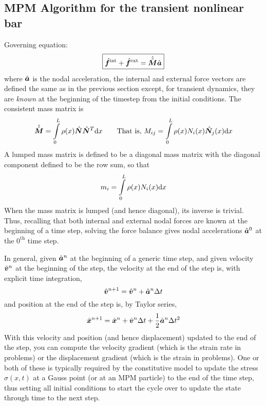 \subsection{MPM Algorithm for the \oneD transient nonlinear bar}
Governing equation:
\begin{equation}
 \boxed{\hat{\bm{f}}^\text{int} +  \hat{\bm{f}}^\text{ext} = \hat{\hat{\bm{M}}}\hat{\bm{a}}}
\label{eq:discrFequalMa}
\end{equation}
where $\hat{\bm{a}}$ is the nodal acceleration, the internal and external force vectors are defined the same as in the previous section except, for transient dynamics, they are \emph{known} at the beginning of the timestep from the initial conditions.  The consistent mass matrix is
\begin{equation}
  \hat{\hat{\bm{M}}}=\int\limits_0^L \rho(x)\hat{\bm{N}} \hat{\bm{N}}^T \mathrm{d} x
\qquad\text{That is, }
  M_{ij}=\int\limits_0^L \rho(x){N}_i(x) \hat{\bm{N}}_j(x) \mathrm{d} x
\end{equation}
A lumped mass matrix is defined to be a diagonal mass matrix with the \ith diagonal component defined to be the \ith row sum, so that
\begin{equation}
  m_i=\int\limits_0^L \rho(x){N}_i(x) \mathrm{d} x
\end{equation}
When the mass matrix is lumped (and hence diagonal), its inverse is trivial. Thus, recalling that both internal and external nodal forces are known at the beginning of a time step, solving the force balance gives nodal accelerations $\hat{\bm{a}}^0$ at the $0^\text{th}$ time step.  

In general, given $\hat{\bm{a}}^n$ at the beginning of a generic \nth time step, and given velocity $\hat{\bm{v}}^n$ at the beginning of the step, the velocity at the end of the step is, with explicit time integration,
\begin{equation}
  \hat{\bm{v}}^{n+1}=\hat{\bm{v}}^{n}+\hat{\bm{a}}^n \Delta {\ensuremath{t}}
\end{equation}
and position at the end of the step is, by Taylor series,
\begin{equation}
  \hat{\bm{x}}^{n+1}=\hat{\bm{x}}^{n}+\hat{\bm{v}}^n \Delta {\ensuremath{t}}+\frac{1}{2}\hat{\bm{a}}^n \Delta{\ensuremath{t}}^2
\end{equation}
With this velocity and position (and hence displacement) updated to the end of the step, you can compute the velocity gradient (which is the strain rate in \oneD problems) or the displacement gradient (which is the strain in \oneD problems). One or both of these is typically required by the constitutive model to update the stress $\sigma(x,t)$ at a Gauss point (or at an MPM particle) to the end of the time step, thus setting all initial conditions to start the cycle over to update the state through time to the next step. 

